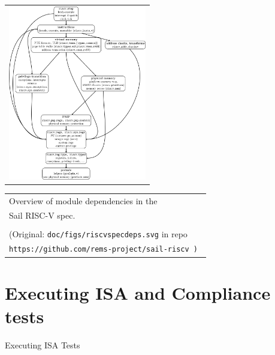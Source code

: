 \documentclass[aspectratio=169]{beamer}
\newcommand{\hm}{\hspace*{1em}}
\newcommand{\hmmm}{\hspace*{3em}}
\newcommand{\slidefont}{\scriptsize}
\begin{document}
\begin{frame}[fragile]

  \slidefont

  \begin{tabular}[c]{l}
    \includegraphics[height=3in]{Figures/riscvspecdeps.png}
  \end{tabular}
  \hmmm
  \begin{tabular}[c]{l}
    Overview of module dependencies in the \\
    Sail RISC-V spec. \\
    \\
    \tiny (Original: {\tt doc/figs/riscvspecdeps.svg} in repo \\
    \hm\tiny\tt https://github.com/rems-project/sail-riscv )
  \end{tabular}

\end{frame}


\section{Executing ISA and Compliance tests}


\begin{frame}[fragile]

  \vfill

  \begin{center}\LARGE
    Executing ISA Tests
  \end{center}

  \vfill

\end{frame}
\end{document}
